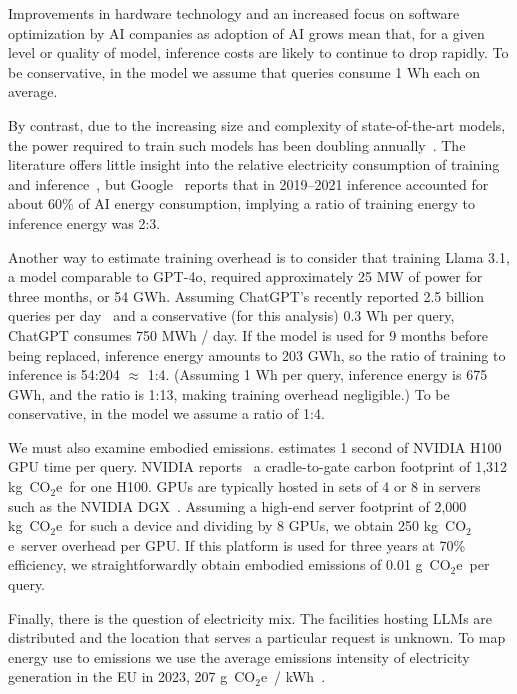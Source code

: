 \documentclass[11pt]{article}
\newcommand{\coe}{CO$_2$e}
\newcommand{\gcoe}{g~\coe}
\newcommand{\kgcoe}{k\gcoe}
\newcommand{\gcoekwh}{\gcoe\ / kWh}
\let\cite\parencite
\begin{document}
Improvements in hardware technology and an increased focus on software optimization by AI companies as adoption of AI grows mean that, for a given level or quality of model, inference costs are likely to continue to drop rapidly. To be conservative, in the model we assume that queries consume 1 Wh each on average.

By contrast, due to the increasing size and complexity of state-of-the-art models, the power required to train such models has been doubling annually~\cite{epoch2024powerusagetrend}. The literature offers little insight into the relative electricity consumption of training and inference~\cite{verdecchia2023systematic}, but Google~\cite{patterson:footprint:2022} reports that in 2019--2021 inference accounted for about 60\% of AI energy consumption, implying a ratio of training energy to inference energy was 2:3.

Another way to estimate training overhead is to consider that training Llama 3.1, a model comparable to GPT-4o, required approximately 25 MW of power for three months, or 54 GWh. Assuming ChatGPT's recently reported 2.5 billion queries per day~\cite{techcrunch:chatgpt} and a conservative (for this analysis) 0.3 Wh per query, ChatGPT consumes 750 MWh / day. If the model is used for 9 months before being replaced, inference energy amounts to 203 GWh, so the ratio of training to inference is 54:204 $\approx$ 1:4. (Assuming 1 Wh per query, inference energy is 675 GWh, and the ratio is 1:13, making training overhead negligible.) To be conservative, in the model we assume a ratio of 1:4.

We must also examine embodied emissions. \textcite{epoch2025howmuchenergydoeschatgptuse} estimates 1 second of NVIDIA H100 GPU time per query. NVIDIA reports~\cite{nvidia:h100} a cradle-to-gate carbon footprint of 1,312 \kgcoe\ for one H100. GPUs are typically hosted in sets of 4 or 8 in servers such as the NVIDIA DGX~\cite{nvidia:dgx}. Assuming a high-end server footprint of 2,000 \kgcoe\ for such a device and dividing by 8 GPUs, we obtain 250 \kgcoe\ server overhead per GPU. If this platform is used for three years at 70\% efficiency, we straightforwardly obtain embodied emissions of 0.01 \gcoe\ per query.


Finally, there is the question of electricity mix. The facilities hosting LLMs are distributed and the location that serves a particular request is unknown. To map energy use to emissions we use the average emissions intensity of electricity generation in the EU in 2023, 207 \gcoekwh~\cite{eea:emissions:2025}.
\end{document}
